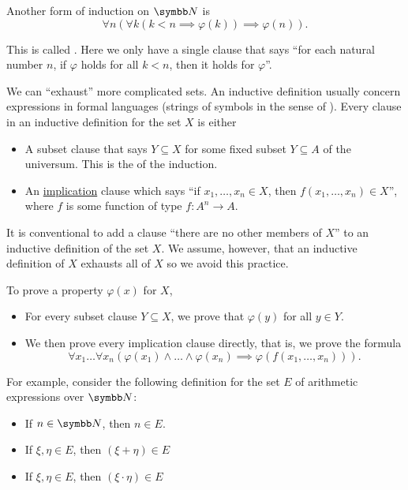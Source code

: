 \begin{remark}
  Another form of induction on \( \BN \) is
  \begin{equation*}
    \forall n (\forall k (k < n \implies \varphi(k)) \implies \varphi(n)).
  \end{equation*}

  This is called . Here we only have a single clause that says \enquote{for each natural number \( n \), if \( \varphi \) holds for all \( k < n \), then it holds for \( \varphi \)}.

  We can \enquote{exhaust} more complicated sets. An inductive definition usually concern expressions in formal languages (strings of symbols in the sense of ). Every clause in an inductive definition for the set \( X \) is either
  \begin{itemize}
    \item A subset clause that says \( Y \subseteq X \) for some fixed subset \( Y \subseteq A \) of the universum. This is the  of the induction.
    \item An \hyperref[def:material_implication]{implication} clause which says \enquote{if \( x_1, \ldots, x_n \in X \), then \( f(x_1, \ldots, x_n) \in X \)}, where \( f \) is some function of type \( f: A^n \to A \).
  \end{itemize}

  It is conventional to add a clause \enquote{there are no other members of \( X \)} to an inductive definition of the set \( X \). We assume, however, that an inductive definition of \( X \) exhausts all of \( X \) so we avoid this practice.

  To prove a property \( \varphi(x) \) for \( X \),
  \begin{itemize}
    \item For every subset clause \( Y \subseteq X \), we prove that \( \varphi(y) \) for all \( y \in Y \).
    \item We then prove every implication clause directly, that is, we prove the formula
    \begin{equation*}
      \forall x_1 \ldots \forall x_n (\varphi(x_1) \land \ldots \land \varphi(x_n) \implies \varphi(f(x_1, \ldots, x_n))).
    \end{equation*}
  \end{itemize}

  For example, consider the following definition for the set \( E \) of arithmetic expressions over \( \BN \):
  \begin{itemize}
    \item If \( n \in \BN \), then \( n \in E \).
    \item If \( \xi, \eta \in E \), then \( (\xi + \eta) \in E \)
    \item If \( \xi, \eta \in E \), then \( (\xi \cdot \eta) \in E \)
  \end{itemize}


\end{remark}
